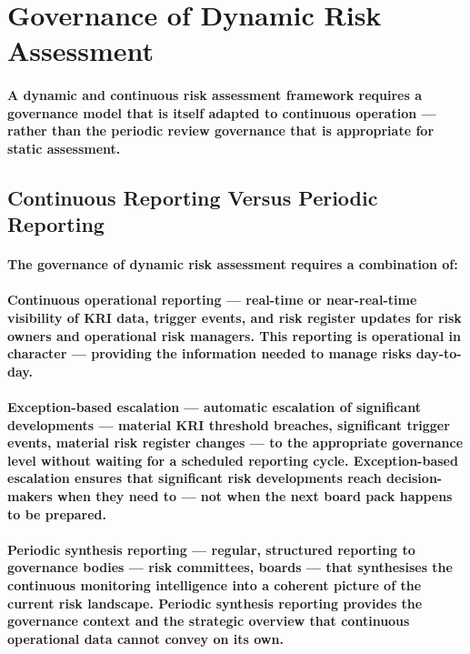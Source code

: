 \section{Governance of Dynamic Risk Assessment}
\paragraph{A dynamic and continuous risk assessment framework requires a governance model that is itself adapted to continuous operation — rather than the periodic review governance that is appropriate for static assessment.}

\subsection{Continuous Reporting Versus Periodic Reporting}
\paragraph{The governance of dynamic risk assessment requires a combination of:}
\paragraph{\textbf{Continuous operational reporting} — real-time or near-real-time visibility of KRI data, trigger events, and risk register updates for risk owners and operational risk managers. This reporting is operational in character — providing the information needed to manage risks day-to-day.}
\paragraph{\textbf{Exception-based escalation} — automatic escalation of significant developments — material KRI threshold breaches, significant trigger events, material risk register changes — to the appropriate governance level without waiting for a scheduled reporting cycle. Exception-based escalation ensures that significant risk developments reach decision-makers when they need to — not when the next board pack happens to be prepared.}
\paragraph{\textbf{Periodic synthesis reporting} — regular, structured reporting to governance bodies — risk committees, boards — that synthesises the continuous monitoring intelligence into a coherent picture of the current risk landscape. Periodic synthesis reporting provides the governance context and the strategic overview that continuous operational data cannot convey on its own.}

